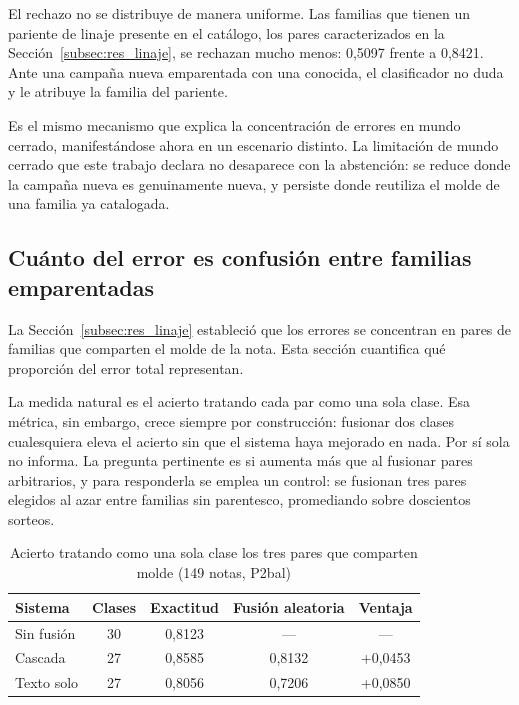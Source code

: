 El rechazo no se distribuye de manera uniforme. Las familias que tienen un pariente de linaje presente en el catálogo, los pares caracterizados en la Sección~\ref{subsec:res_linaje}, se rechazan mucho menos: 0,5097 frente a 0,8421. Ante una campaña nueva emparentada con una conocida, el clasificador no duda y le atribuye la familia del pariente.

Es el mismo mecanismo que explica la concentración de errores en mundo cerrado, manifestándose ahora en un escenario distinto. La limitación de mundo cerrado que este trabajo declara no desaparece con la abstención: se reduce donde la campaña nueva es genuinamente nueva, y persiste donde reutiliza el molde de una familia ya catalogada.


\subsection{Cuánto del error es confusión entre familias emparentadas}
\label{subsec:res_error_linaje}

La Sección~\ref{subsec:res_linaje} estableció que los errores se concentran en pares de familias que comparten el molde de la nota. Esta sección cuantifica qué proporción del error total representan.

La medida natural es el acierto tratando cada par como una sola clase. Esa métrica, sin embargo, crece siempre por construcción: fusionar dos clases cualesquiera eleva el acierto sin que el sistema haya mejorado en nada. Por sí sola no informa. La pregunta pertinente es si aumenta más que al fusionar pares arbitrarios, y para responderla se emplea un control: se fusionan tres pares elegidos al azar entre familias sin parentesco, promediando sobre doscientos sorteos.

\begin{table}[ht]
\centering
\caption{Acierto tratando como una sola clase los tres pares que comparten molde (149 notas, P2bal)}
\label{tab:acierto_linaje}
\begin{tabular}{|l|c|c|c|c|}
\hline
\textbf{Sistema} & \textbf{Clases} & \textbf{Exactitud} & \textbf{Fusión aleatoria} & \textbf{Ventaja} \\
\hline
Sin fusión & 30 & 0,8123 & --- & --- \\
Cascada & 27 & 0,8585 & 0,8132 & +0,0453 \\
Texto solo & 27 & 0,8056 & 0,7206 & +0,0850 \\
\hline
\end{tabular}
\end{table}

